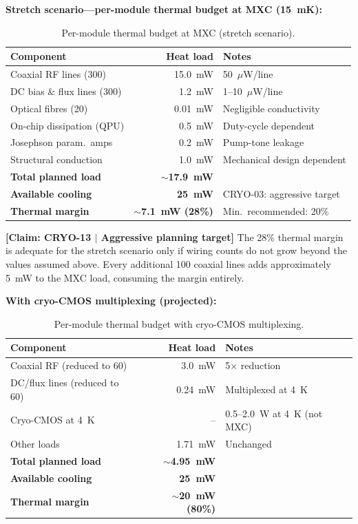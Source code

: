 \documentclass[conference]{IEEEtran}
\begin{document}
\textbf{Stretch scenario---per-module thermal budget at MXC (15~mK):}

\begin{table}[H]
\centering
\caption{Per-module thermal budget at MXC (stretch scenario).}
\label{tab:thermal-budget}
\footnotesize
\begin{tabularx}{\columnwidth}{L{3.0cm}rL{2.5cm}}
\toprule
\textbf{Component} & \textbf{Heat load} & \textbf{Notes} \\
\midrule
Coaxial RF lines (300) & 15.0~mW & 50~$\mu$W/line~\cite{Krinner2019} \\
DC bias \& flux lines (300) & 1.2~mW & 1--10~$\mu$W/line~\cite{Reilly2015} \\
Optical fibres (20) & 0.01~mW & Negligible conductivity \\
On-chip dissipation (QPU) & 0.5~mW & Duty-cycle dependent \\
Josephson param.\ amps & 0.2~mW & Pump-tone leakage \\
Structural conduction & 1.0~mW & Mechanical design dependent \\
\midrule
\textbf{Total planned load} & \textbf{$\sim$17.9~mW} & \\
\textbf{Available cooling} & \textbf{25~mW} & CRYO-03: aggressive target \\
\textbf{Thermal margin} & \textbf{$\sim$7.1~mW (28\%)} & Min.\ recommended: 20\% \\
\bottomrule
\end{tabularx}
\end{table}

\textbf{[Claim: CRYO-13 $|$ Aggressive planning target]} The 28\% thermal margin is adequate for the stretch scenario only if wiring counts do not grow beyond the values assumed above. Every additional 100 coaxial lines adds approximately 5~mW to the MXC load, consuming the margin entirely.

\textbf{With cryo-CMOS multiplexing (projected):}

\begin{table}[H]
\centering
\caption{Per-module thermal budget with cryo-CMOS multiplexing.}
\label{tab:thermal-cryocmos}
\footnotesize
\begin{tabularx}{\columnwidth}{L{3.2cm}rL{2.5cm}}
\toprule
\textbf{Component} & \textbf{Heat load} & \textbf{Notes} \\
\midrule
Coaxial RF (reduced to 60) & 3.0~mW & 5$\times$ reduction~\cite{Bardin2019, VanDijk2019} \\
DC/flux lines (reduced to 60) & 0.24~mW & Multiplexed at 4~K \\
Cryo-CMOS at 4~K & -- & 0.5--2.0~W at 4~K (not MXC) \\
Other loads & 1.71~mW & Unchanged \\
\midrule
\textbf{Total planned load} & \textbf{$\sim$4.95~mW} & \\
\textbf{Available cooling} & \textbf{25~mW} & \\
\textbf{Thermal margin} & \textbf{$\sim$20~mW (80\%)} & \\
\bottomrule
\end{tabularx}
\end{table}
\end{document}
